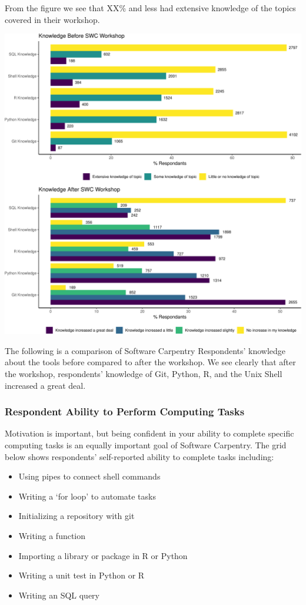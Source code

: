 \documentclass[]{article}
\providecommand{\tightlist}{%
  \setlength{\itemsep}{0pt}\setlength{\parskip}{0pt}}
\begin{document}
From the figure we see that XX\% and less had extensive knowledge of the
topics covered in their workshop.

\includegraphics[width=720]{figures/swc-knowledge-change-1}

The following is a comparison of Software Carpentry Respondents'
knowledge about the tools before compared to after the workshop. We see
clearly that after the workshop, respondents' knowledge of Git, Python,
R, and the Unix Shell increased a great deal.

\subsubsection{Respondent Ability to Perform Computing
Tasks}\label{respondent-ability-to-perform-computing-tasks}

Motivation is important, but being confident in your ability to complete
specific computing tasks is an equally important goal of Software
Carpentry. The grid below shows respondents' self-reported ability to
complete tasks including:

\begin{itemize}
\tightlist
\item
  Using pipes to connect shell commands
\item
  Writing a `for loop' to automate tasks\\
\item
  Initializing a repository with git
\item
  Writing a function
\item
  Importing a library or package in R or Python
\item
  Writing a unit test in Python or R
\item
  Writing an SQL query
\end{itemize}
\end{document}
